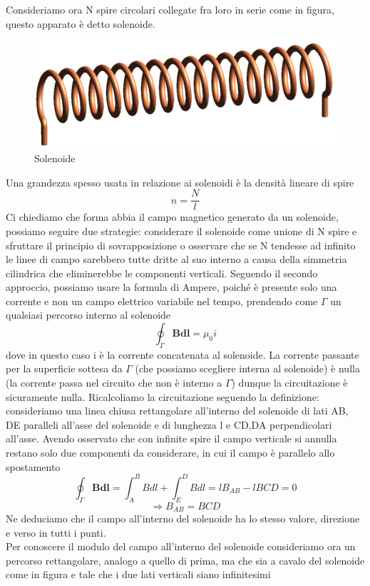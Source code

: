 \documentclass[
10pt, %
a4paper, %
oneside, %
headinclude,footinclude, %
BCOR5mm, %
]{scrartcl}
\begin{document}
Consideriamo ora N spire circolari collegate fra loro in serie come in figura, questo apparato è detto solenoide.
\begin{figure}[h!]
	\centering
	\includegraphics[width=0.6\linewidth]{../images/Solenoid}
	\caption{Solenoide}
	\label{fig:solenoide}
\end{figure}
\FloatBarrier
Una grandezza spesso usata in relazione ai solenoidi è la densità lineare di spire 
\[n = \frac{N}{l}\]
Ci chiediamo che forma abbia il campo magnetico generato da un solenoide, possiamo seguire due strategie: considerare il solenoide come unione di N spire e sfruttare il principio di sovrapposizione o osservare che se N tendesse ad infinito le linee di campo sarebbero tutte dritte al suo interno a causa della simmetria cilindrica che eliminerebbe le componenti verticali. Seguendo il secondo approccio, possiamo usare la formula di Ampere, poiché è presente solo una corrente e non un campo elettrico variabile nel tempo, prendendo come $\Gamma$ un qualsiasi percorso interno al solenoide
\[\oint_{\Gamma}\mathbf{B}\mathbf{dl}= \mu_0 i\]
dove in questo caso i è la corrente concatenata al solenoide. La corrente passante per la superficie sottesa da $\Gamma$ (che possiamo scegliere interna al solenoide) è nulla (la corrente passa nel circuito che non è interno a $\Gamma$) dunque la circuitazione è sicuramente nulla. 
Ricalcoliamo la circuitazione seguendo la definizione: consideriamo una linea chiusa rettangolare all'interno del solenoide di lati AB, DE paralleli all'asse del solenoide e di lunghezza l e CD,DA perpendicolari all'asse. Avendo osservato che con infinite spire il campo verticale si annulla restano solo due componenti da considerare, in cui il campo è parallelo allo spostamento
\[\oint_{\Gamma}\mathbf{B}\mathbf{dl}= \int_{A}^{B}Bdl+\int_{E}^{D}Bdl=lB_{AB}-lB{CD}=0\]
\[\Rightarrow B_{AB}=B{CD}\]
Ne deduciamo che il campo all'interno del solenoide ha lo stesso valore, direzione e verso in tutti i punti.\\
Per conoscere il modulo del campo all'interno del solenoide consideriamo ora un percorso rettangolare, analogo a quello di prima, ma che sia a cavalo del solenoide come in figura e tale che i due lati verticali siano infinitesimi
\end{document}
